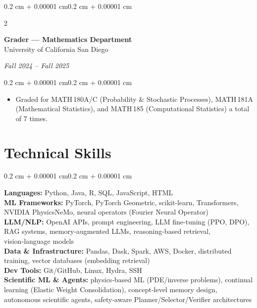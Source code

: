 \documentclass[10pt, letterpaper]{article}
\newenvironment{highlights}{
    \begin{itemize}[
        topsep=0.10 cm,
        parsep=0.10 cm,
        partopsep=0pt,
        itemsep=0pt,
        leftmargin=0.4 cm + 10pt
    ]
}{\end{itemize}}
\newenvironment{onecolentry}{
    \begin{adjustwidth}{0.2 cm + 0.00001 cm}{0.2 cm + 0.00001 cm}
}{\end{adjustwidth}}
\newenvironment{twocolentry}[2][]{
    \onecolentry
    \def\secondColumn{#2}
    \setcolumnwidth{\fill, 4.5 cm}
    \begin{paracol}{2}
}{
    \switchcolumn \raggedleft \secondColumn
    \end{paracol}
    \endonecolentry
}
\begin{document}
    \vspace{0.15 cm}

    \begin{twocolentry}{\textit{Fall 2024 -- Fall 2025}}
        \textbf{Grader — Mathematics Department}\\
        University of California San Diego
    \end{twocolentry}

    \vspace{0.10 cm}
    \begin{onecolentry}
        \begin{highlights}
            \item Graded for MATH\,180A/C (Probability \& Stochastic Processes), MATH\,181A (Mathematical Statistics), and MATH\,185 (Computational Statistics) a total of 7 times.
        \end{highlights}
    \end{onecolentry}

    \section{Technical Skills}

    \begin{onecolentry}
        \textbf{Languages:} Python, Java, R, SQL, JavaScript, HTML\\[3pt]
        \textbf{ML Frameworks:} PyTorch, PyTorch Geometric, scikit-learn, Transformers, NVIDIA PhysicsNeMo, neural operators (Fourier Neural Operator)\\[3pt]
        \textbf{LLM/NLP:} OpenAI APIs, prompt engineering, LLM fine-tuning (PPO, DPO), RAG systems, memory‑augmented LLMs, reasoning‑based retrieval, vision‑language models\\[3pt]
        \textbf{Data \& Infrastructure:} Pandas, Dask, Spark, AWS, Docker, distributed training, vector databases (embedding retrieval)\\[3pt]
        \textbf{Dev Tools:} Git/GitHub, Linux, Hydra, SSH\\[3pt]
        \textbf{Scientific ML \& Agents:} physics‑based ML (PDE/inverse problems), continual learning (Elastic Weight Consolidation), concept‑level memory design, autonomous scientific agents, safety‑aware Planner/Selector/Verifier architectures
    \end{onecolentry}
\end{document}
